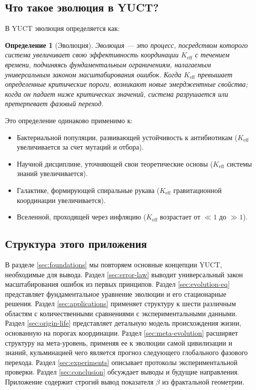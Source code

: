 \documentclass[12pt,a4paper]{article}
\newtheorem{definition}[theorem]{Определение}
\theoremstyle{remark}
\newcommand{\Keff}{K_{\mathrm{eff}}}
\begin{document}
	\subsection{Что такое эволюция в YUCT?}
	
	В YUCT эволюция определяется как:
	
	\begin{definition}[Эволюция]
		Эволюция — это процесс, посредством которого система увеличивает свою эффективность координации $\Keff$ с течением времени, подчиняясь фундаментальным ограничениям, налагаемым универсальным законом масштабирования ошибок. Когда $\Keff$ превышает определенные критические пороги, возникают новые эмерджентные свойства; когда он падает ниже критических значений, система разрушается или претерпевает фазовый переход.
	\end{definition}
	
	Это определение одинаково применимо к:
	
	\begin{itemize}
		\item Бактериальной популяции, развивающей устойчивость к антибиотикам ($\Keff$ увеличивается за счет мутаций и отбора).
		\item Научной дисциплине, уточняющей свои теоретические основы ($\Keff$ системы знаний увеличивается).
		\item Галактике, формирующей спиральные рукава ($\Keff$ гравитационной координации увеличивается).
		\item Вселенной, проходящей через инфляцию ($\Keff$ возрастает от $\ll 1$ до $\gg 1$).
	\end{itemize}
	
	\subsection{Структура этого приложения}
	
	В разделе \ref{sec:foundations} мы повторяем основные концепции YUCT, необходимые для вывода. Раздел \ref{sec:error-law} выводит универсальный закон масштабирования ошибок из первых принципов. Раздел \ref{sec:evolution-eq} представляет фундаментальное уравнение эволюции и его стационарные решения. Раздел \ref{sec:applications} применяет структуру к шести различным областям с количественными сравнениями с экспериментальными данными. Раздел \ref{sec:origin-life} представляет детальную модель происхождения жизни, основанную на порогах координации. Раздел \ref{sec:meta-evolution} расширяет структуру на мета-уровень, применяя ее к эволюции самой цивилизации и знаний, кульминацией чего является прогноз следующего глобального фазового перехода. Раздел \ref{sec:experiments} описывает протоколы экспериментальной проверки. Раздел \ref{sec:conclusion} обсуждает выводы и будущие направления. Приложение содержит строгий вывод показателя $\beta$ из фрактальной геометрии.
	
\end{document}
